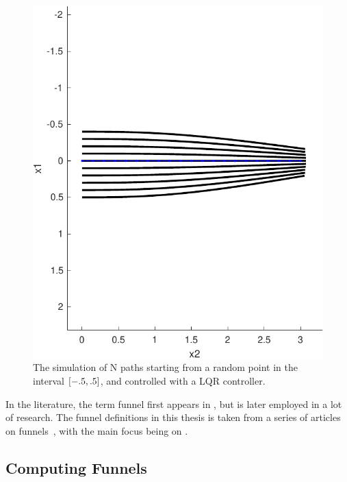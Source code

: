 \begin{figure}
  \centering \includegraphics[scale=.6]{figures/preliminaries/montecarlofunnel}
  \caption[Monte-Carlo simulation of the funnel for the \ac{LQR}-controller]{The simulation of N paths starting from a random point in the
    interval \(\lbrack-.5,.5\rbrack\), and controlled with a LQR controller.}
  \label{fig:monte-carlo-sim}
\end{figure}

In the literature, the term funnel first appears in
\textcite{masonMechanicsManipulation1985}, but is later employed in a lot of
research. The funnel definitions in this thesis is taken from a series of
articles on funnels~\cite{Tobenkin_2011,tedrakeLQRtreesFeedbackMotion2009,
  majumdarRobustOnlineMotion2013,
  majumdarFunnelLibrariesRealtime2017,ahmadi2014dsos}, with the main focus being
on \textcite{majumdarFunnelLibrariesRealtime2017}.

\subsection{Computing Funnels}

